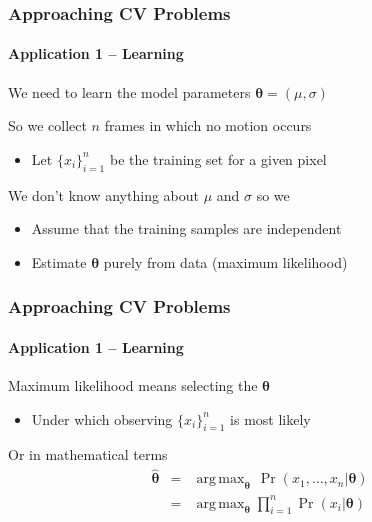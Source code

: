 \documentclass[xetex,professionalfont]{beamer}
\DeclareMathOperator*{\argmax}{arg\,max}
\newcommand{\bth}{\boldsymbol{\theta}}
\renewcommand\emph[1]{\textcolor{tuwcvl_inf_red}{#1}}
\begin{document}

\begin{frame}
\frametitle{Approaching CV Problems}
\framesubtitle{Application 1 -- Learning}

We need to learn the \emph{model parameters} $\bth=(\mu,\sigma)$

\bigskip
So we collect $n$ frames in which no motion occurs
\begin{itemize}
    \item Let $\{x_i\}_{i=1}^n$ be the training set for a given pixel
\end{itemize}

\bigskip
We don't know anything about $\mu$ and $\sigma$ so we
\begin{itemize}
    \item Assume that the training samples are independent %
    \item Estimate $\bth$ purely from data (\emph{maximum likelihood}) %
\end{itemize}

\end{frame}



\begin{frame}
\frametitle{Approaching CV Problems}
\framesubtitle{Application 1 -- Learning}

Maximum likelihood means selecting the $\bth$
\begin{itemize}
    \item Under which observing $\{x_i\}_{i=1}^n$ is most likely
\end{itemize}

\bigskip
Or in mathematical terms
\begin{eqnarray*}
  \hat{\bth}&=&\argmax_{\bth}\,\Pr(x_1,\dots,x_n|\bth) \\ %
  &=&\argmax_{\bth}\prod_{i=1}^n \Pr(x_i|\bth) %
\end{eqnarray*}

\end{frame}

\end{document}
